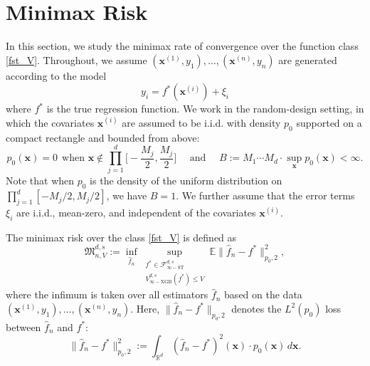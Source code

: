 \documentclass[10pt]{article}
\newcommand{\E}{{\mathbb E}}
\newcommand{\R}{{\mathbb R}}
\newcommand{\fstinf}{{\mathcal{F}^{d, s}_{\infty-\text{ST}}}}
\newcommand{\vinfxgb}{{V^{d, s}_{\infty-\text{XGB}}}}
\newcommand{\minimax}{{\mathfrak{M}^{d, s}_{n, V}}}
\newcommand{\xbf}{{\mathbf{x}}}
\begin{document}
\section{Minimax Risk}
\label{sec:minimax-rate}

In this section, we study the minimax rate of convergence over 
the function class \eqref{fst_V}. Throughout, we assume 
$(\xbf^{(1)}, y_1), \dots, (\xbf^{(n)}, y_n)$ are generated  
according to the model
\begin{equation*}
    y_i = f^*(\xbf^{(i)}) + \xi_i
\end{equation*}
where $f^*$ is the true regression function. We work in the 
random-design setting, in which the covariates $\xbf^{(i)}$ are 
assumed to be i.i.d. with density $p_0$ supported on a 
compact rectangle and bounded from above:
\begin{equation}\label{density-compact-support}
    p_0(\xbf) = 0 \ \ \text{when } \xbf \notin 
    \prod_{j = 1}^{d} \Big[-\frac{M_j}{2}, \frac{M_j}{2}\Big] 
    \quad \text{ and } \quad  
    B := M_1 \cdots M_d \cdot \sup_{\xbf} p_0(\xbf) < \infty.
\end{equation}
Note that when $p_0$ is the density of the uniform distribution on 
$\prod_{j = 1}^{d} [-M_j/2, M_j/2]$, we have $B = 1$.
We further assume that the error terms $\xi_i$ are i.i.d., 
mean-zero, and independent of the covariates $\xbf^{(i)}$.

The minimax risk over the class \eqref{fst_V} is defined as 
\begin{equation}\label{minimax-risk}
    \minimax := 
    \inf_{\hat{f}_n} \sup_{\substack{f^* \in \fstinf \\ 
    \vinfxgb(f^*) \le V}} 
    \E \|\hat{f}_n - f^*\|_{p_0, 2}^2,
\end{equation}
where the infimum is taken over all estimators $\hat{f}_n$ 
based on the data $(\xbf^{(1)}, y_1), \dots, (\xbf^{(n)}, y_n)$. 
Here, $\|\hat{f}_n - f^*\|_{p_0, 2}$ denotes the $L^2(p_0)$ loss 
between $\hat{f}_n$ and $f^*$: 
\begin{equation*}
    \|\hat{f}_n - f^*\|_{p_0, 2}^2
    := \int_{\R^d} (\hat{f}_n - f^*)^2(\xbf) 
    \cdot p_0(\xbf) \, d\xbf.
\end{equation*}
\end{document}

